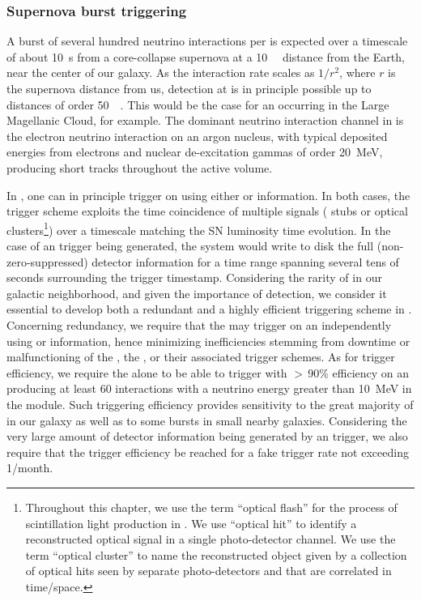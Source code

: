 \subsubsection{Supernova burst triggering}

A burst of several hundred neutrino interactions per  is expected over a timescale of about \SI{10}{\s} from a core-collapse supernova at a \SI{10}{\kilo\parsec} distance from the Earth, near the center of our galaxy. As the  interaction rate scales as $1/r^2$, where $r$ is the supernova distance from us,  detection at \dune is in principle possible up to distances of order \SI{50}{\kilo\parsec}. This would be the case for an  occurring in the Large Magellanic Cloud, for example. The dominant neutrino interaction channel in \dune is the  electron neutrino interaction on an argon nucleus, with typical deposited energies from electrons and nuclear de-excitation gammas of order \SI{20}{\MeV}, producing short tracks throughout the  active volume.

In \dune, one can in principle trigger on  using either  or  information. In both cases, the trigger scheme exploits the time coincidence of multiple signals ( stubs or  optical clusters\footnote{Throughout this chapter, we use the term ``optical flash'' for the process of scintillation light production in . We use ``optical hit'' to identify a reconstructed optical signal in a single photo-detector channel. We use the term ``optical cluster'' to name the reconstructed object given by a collection of optical hits seen by separate photo-detectors and that are correlated in time/space.}) over a timescale matching the SN luminosity time evolution. In the case of an  trigger being generated, the  system would write to disk the full (non-zero-suppressed) detector information for a time range spanning several tens of seconds surrounding the trigger timestamp. Considering the rarity of  in our galactic neighborhood, and given the importance of  detection, we consider it essential to develop both a redundant and a highly efficient  triggering scheme in . Concerning redundancy, we require that the \dune {} may trigger on an  independently using  or  information, hence minimizing  inefficiencies stemming from downtime or malfunctioning of the , the , or their associated trigger schemes. As for trigger efficiency, we require the  alone to be able to trigger with $>\,$90\% efficiency on an  producing at least 60 interactions with a neutrino energy greater than \SI{10}{MeV} in the   module. Such triggering efficiency provides sensitivity to the great majority of  in our galaxy  as well as to  some bursts in small nearby galaxies. Considering the very large amount of detector information being generated by an  trigger, we also require that the  trigger efficiency be reached for a  fake trigger rate not exceeding \num{1}/month.

